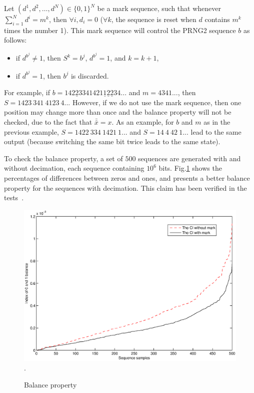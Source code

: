 Let $(d^1,d^2,\dots,d^N)\in \{0,1\}^N$ be a mark sequence, such that whenever $\sum_{i=1}^N d^i = m^k$,
then $\forall i, d_i=0$ ($\forall k$, the sequence is reset when $d$ contains $m^k$ times the number 1). This mark sequence will control the PRNG2 sequence $b$ as follows:
\begin{itemize}
\item if $d^{b^j} \neq 1$, then $S^k=b^j$, $d^{b^j} = 1$, and $k = k+1$,
\item if $d^{b^j}=1$, then $b^j$ is discarded.
\end{itemize}
For example, if $b = 142\underline{2}334 1421\underline{1}\underline{2}\underline{2}34...$ and $m = 4341...$, then $S=1423~341~4123~4...$ However, if we do not use the mark sequence, then one position may change more than once and the balance property will not be checked, due to the fact that $\bar{\bar{x}}=x$. As an example, for $b$ and $m$ as in the previous example, $S=1422~334~1421~1...$ and $S=14~4~42~1...$ lead to the same output (because switching the same bit twice leads to the same state).

 
To check the balance property, a set of $500$
sequences are generated with and without decimation, each
sequence containing $10^6$ bits. Fig.\ref{nmark} shows the
percentages of differences between zeros and ones, and presents a better balance property for the sequences with decimation. This claim has been verified in the tests~\cite{wbg10:ip}. 

\begin{figure}
\centering
\includegraphics[width=15cm]{nmark.eps}
\DeclareGraphicsExtensions.
\caption{Balance property}
\label{nmark}
\end{figure}


